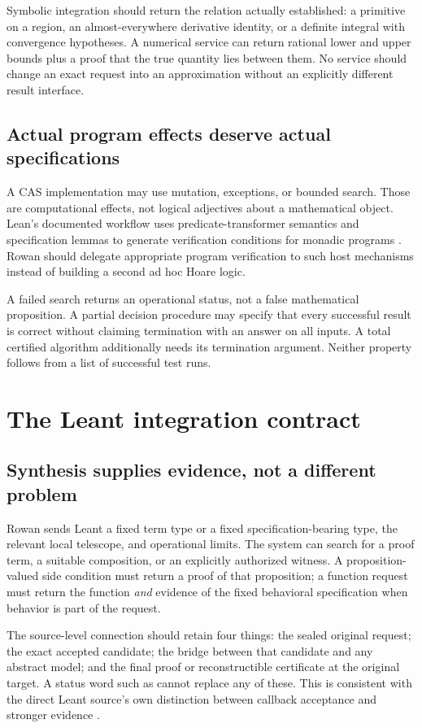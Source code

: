 \documentclass[11pt,letterpaper]{article}
\newcommand{\code}[1]{\texttt{\detokenize{#1}}}
\theoremstyle{definition}\newtheorem{definition}[theorem]{Definition}
\theoremstyle{remark}\newtheorem{remark}[theorem]{Remark}
\begin{document}
Symbolic integration should return the relation actually established: a
primitive on a region, an almost-everywhere derivative identity, or a definite
integral with convergence hypotheses. A numerical service can return rational
lower and upper bounds plus a proof that the true quantity lies between them.
No service should change an exact request into an approximation without an
explicitly different result interface.

\subsection{Actual program effects deserve actual specifications}
A CAS implementation may use mutation, exceptions, or bounded search.
Those are computational effects, not logical adjectives about a mathematical
object. Lean's documented \code{mvcgen} workflow uses predicate-transformer
semantics and specification lemmas to generate verification conditions for
monadic programs \cite{mvcgen}. Rowan should delegate appropriate program
verification to such host mechanisms instead of building a second ad hoc
Hoare logic.

A failed search returns an operational status, not a false mathematical
proposition. A partial decision procedure may specify that every successful
result is correct without claiming termination with an answer on all inputs.
A total certified algorithm additionally needs its termination argument.
Neither property follows from a list of successful test runs.

\section{The Leant integration contract}
\label{sec:leant}

\subsection{Synthesis supplies evidence, not a different problem}
Rowan sends Leant a fixed term type or a fixed specification-bearing type,
the relevant local telescope, and operational limits. The system can search
for a proof term, a suitable composition, or an explicitly authorized witness.
A proposition-valued side condition must return a proof of that proposition;
a function request must return the function \emph{and} evidence of the fixed
behavioral specification when behavior is part of the request.

The source-level connection should retain four things: the sealed original
request; the exact accepted candidate; the bridge between that candidate and
any abstract model; and the final proof or reconstructible certificate at the
original target. A status word such as \code{Verified} cannot replace any
of these. This is consistent with the direct Leant source's own distinction
between callback acceptance and stronger evidence \cite{leantverify}.
\end{document}
